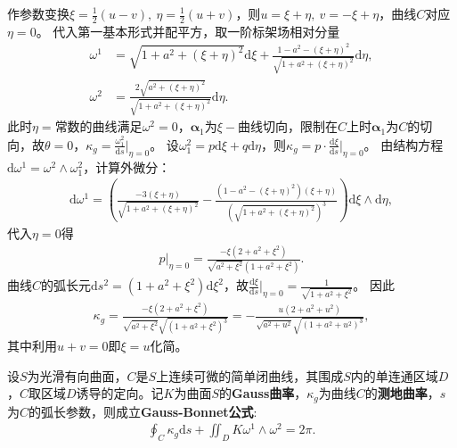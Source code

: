 \documentclass[../../main.tex]{subfiles}%
\begin{document}
\begin{solution}

作参数变换$\xi=\frac{1}{2}(u-v),\ \eta=\frac{1}{2}(u+v)$，则$u=\xi+\eta,\ v=-\xi+\eta$，曲线$C$对应$\eta=0$。
代入第一基本形式并配平方，取一阶标架场相对分量
\begin{align*}
\omega^1&=\sqrt{1+a^2+(\xi+\eta)^2}\mathrm{d}\xi+\frac{1-a^2-(\xi+\eta)^2}{\sqrt{1+a^2+(\xi+\eta)^2}}\mathrm{d}\eta,\\
\omega^2&=\frac{2\sqrt{a^2+(\xi+\eta)^2}}{\sqrt{1+a^2+(\xi+\eta)^2}}\mathrm{d}\eta.
\end{align*}
此时$\eta=$常数的曲线满足$\omega^2=0$，$\boldsymbol{\alpha}_1$为$\xi-$曲线切向，限制在$C$上时$\boldsymbol{\alpha}_1$为$C$的切向，故$\theta=0$，$\kappa_g=\frac{\omega_1^2}{\mathrm{d}s}\big|_{\eta=0}$。
设$\omega_1^2=p\mathrm{d}\xi+q\mathrm{d}\eta$，则$\kappa_g=p\cdot\frac{\mathrm{d}\xi}{\mathrm{d}s}\big|_{\eta=0}$。
由结构方程$\mathrm{d}\omega^1=\omega^2\wedge\omega_1^2$，计算外微分：
\begin{align*}
\mathrm{d}\omega^1=\left(\frac{-3(\xi+\eta)}{\sqrt{1+a^2+(\xi+\eta)^2}}-\frac{(1-a^2-(\xi+\eta)^2)(\xi+\eta)}{\left(\sqrt{1+a^2+(\xi+\eta)^2}\right)^3}\right)\mathrm{d}\xi\wedge\mathrm{d}\eta,
\end{align*}
代入$\eta=0$得
\begin{align*}
p\big|_{\eta=0}=\frac{-\xi(2+a^2+\xi^2)}{\sqrt{a^2+\xi^2}(1+a^2+\xi^2)}.
\end{align*}
曲线$C$的弧长元$\mathrm{d}s^2=(1+a^2+\xi^2)\mathrm{d}\xi^2$，故$\frac{\mathrm{d}\xi}{\mathrm{d}s}\big|_{\eta=0}=\frac{1}{\sqrt{1+a^2+\xi^2}}$。
因此
\begin{align*}
\kappa_g=\frac{-\xi(2+a^2+\xi^2)}{\sqrt{a^2+\xi^2}\sqrt{(1+a^2+\xi^2)^3}}=-\frac{u(2+a^2+u^2)}{\sqrt{a^2+u^2}\sqrt{(1+a^2+u^2)^3}},
\end{align*}
其中利用$u+v=0$即$\xi=u$化简。

\end{solution}

\begin{theorem}
设$S$为光滑有向曲面，$C$是$S$上连续可微的简单闭曲线，其围成$S$内的单连通区域$D$，$C$取区域$D$诱导的定向。记$K$为曲面$S$的\textbf{Gauss曲率}，$\kappa_g$为曲线$C$的\textbf{测地曲率}，$s$为$C$的弧长参数，则成立\textbf{Gauss-Bonnet公式}:
\begin{align}
\oint_C \kappa_g \mathrm{d}s + \iint_D K \omega^1 \land \omega^2 = 2\pi. \label{eq:gauss_bonnet_single}
\end{align}
\end{theorem}
\end{document}

